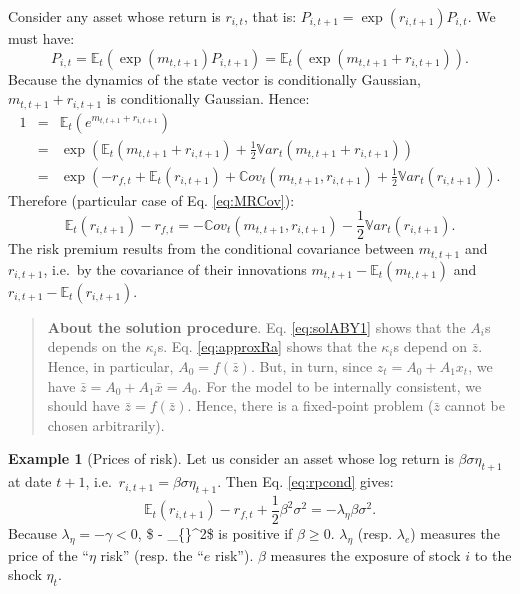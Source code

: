 \documentclass[
  12pt,
]{book}
\theoremstyle{definition}
\theoremstyle{definition}
\newtheorem{example}{Example}[chapter]
\theoremstyle{definition}
\theoremstyle{definition}
\theoremstyle{remark}
\begin{document}
Consider any asset whose return is \(r_{i,t}\), that is: \(P_{i,t+1} = \exp(r_{i,t+1})P_{i,t}\). We must have:
\[
P_{i,t} = \mathbb{E}_t(\exp(m_{t,t+1})P_{i,t+1})= \mathbb{E}_t(\exp(m_{t,t+1}+r_{i,t+1})).
\]
Because the dynamics of the state vector is conditionally Gaussian, \(m_{t,t+1}+r_{i,t+1}\) is conditionally Gaussian. Hence:
\begin{eqnarray*}
1&=&\mathbb{E}_t\left(e^{m_{t,t+1}+r_{i,t+1}}\right)\\
&=&  \exp\left(\mathbb{E}_t(m_{t,t+1}+r_{i,t+1}) + \frac{1}{2}\mathbb{V}ar_t(m_{t,t+1}+r_{i,t+1})\right)\\
&=&  \exp\left(-r_{f,t}+\mathbb{E}_t(r_{i,t+1}) + \mathbb{C}ov_t(m_{t,t+1},r_{i,t+1}) + \frac{1}{2}\mathbb{V}ar_t(r_{i,t+1})\right).
\end{eqnarray*}
Therefore (particular case of Eq. \eqref{eq:MRCov}):
\begin{equation}
\mathbb{E}_t(r_{i,t+1}) -r_{f,t} = - \mathbb{C}ov_t(m_{t,t+1},r_{i,t+1}) - \frac{1}{2}\mathbb{V}ar_t(r_{i,t+1}).\label{eq:rpcond}
\end{equation}
The risk premium results from the conditional covariance between \(m_{t,t+1}\) and \(r_{i,t+1}\), i.e.~by the covariance of their innovations \(m_{t,t+1} - \mathbb{E}_t(m_{t,t+1})\) and \(r_{i,t+1} - \mathbb{E}_t(r_{i,t+1})\).

\begin{quote}
\textbf{About the solution procedure}. Eq. \eqref{eq:solABY1} shows that the \(A_i\)s depends on the \(\kappa_i\)s. Eq. \eqref{eq:approxRa} shows that the \(\kappa_i\)s depend on \(\bar{z}\).
Hence, in particular, \(A_0 = f(\bar{z})\). But, in turn, since \(z_t = A_0 + A_1 x_t\), we have \(\bar{z}=A_0 + A_1 \bar{x}=A_0\). For the model to be internally consistent, we should have \(\bar{z}=f(\bar{z})\). Hence, there is a fixed-point problem (\(\bar{z}\) cannot be chosen arbitrarily).
\end{quote}

\begin{example}[Prices of risk]
\protect\hypertarget{exm:PrRiskEZ}{}\label{exm:PrRiskEZ}Let us consider an asset whose log return is \(\beta\sigma\eta_{t+1}\) at date \(t+1\), i.e.~\(r_{i,t+1}=\beta\sigma\eta_{t+1}\).
Then Eq. \eqref{eq:rpcond} gives:
\[
\mathbb{E}_t(r_{i,t+1}) -r_{f,t} + \frac{1}{2}\beta^2\sigma^2 = - \lambda_{\eta}\beta\sigma^2.
\]
Because \(\lambda_{\eta}=-\gamma<0\), \$ - \lambda\_\{\eta\}\beta\sigma\^{}2\$ is positive if \(\beta\ge0\).
\(\lambda_\eta\) (resp. \(\lambda_{e}\)) measures the price of the ``\(\eta\) risk'' (resp. the ``\(e\) risk'').
\(\beta\) measures the exposure of stock \(i\) to the shock \(\eta_{t}\).
\end{example}
\end{document}
